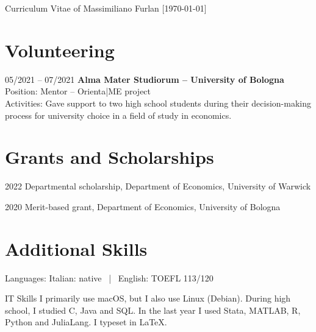 \documentclass[11pt,a4paper]{article}
\begin{document}
\begin{cv}{\huge Curriculum Vitae of Massimiliano Furlan \normalsize{[\mydatestyle\today]}}
\section{Volunteering}
\begin{cvlist}{}
	\item[05/2021 -- 07/2021]
		\textbf{Alma Mater Studiorum – University of Bologna}\\
		Position: Mentor -- Orienta|ME project\\
		Activities: Gave support to two high school students during their decision-making process for university choice in a field of study in economics.
\end{cvlist}
\vspace{-20pt}

\section{Grants and Scholarships}
\begin{cvlist}{}
	\itemsep -4pt
	\item[2022] Departmental scholarship, Department of Economics, University of Warwick 
	\item[2020] Merit-based grant, Department of Economics, University of Bologna
\end{cvlist}


\section{Additional Skills}
\begin{cvlist}{}
	\item[Languages:] 
		Italian: native \ | \
		English: TOEFL 113/120
	\item[IT Skills] 
		I primarily use macOS, but I also use Linux (Debian). During high school, I studied C, Java and SQL. In the last year I used Stata, MATLAB, R, Python and JuliaLang. I typeset in \LaTeX.
\end{cvlist}


\end{cv}
\end{document}
